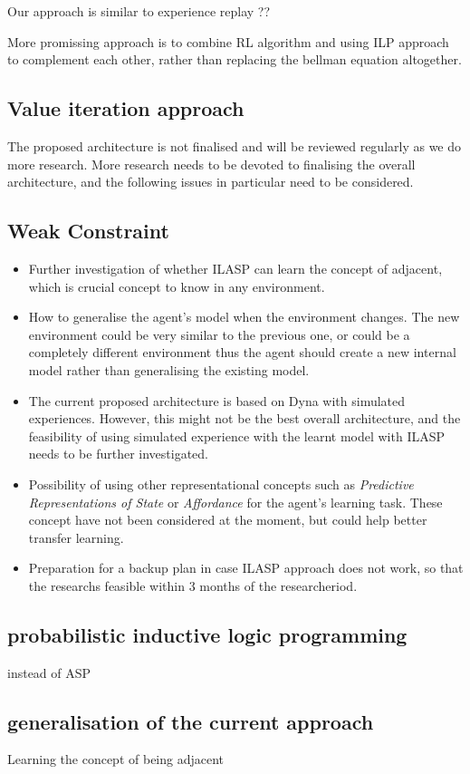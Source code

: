 Our approach is similar to experience replay ??

More promissing approach is to combine RL algorithm and using ILP approach to complement each other, rather than replacing the bellman equation altogether. 

\subsection{Value iteration approach}

The proposed architecture is not finalised and will be reviewed regularly as we do more research.
More research needs to be devoted to finalising the overall architecture, and the following issues in particular need to be considered.

\subsection{Weak Constraint}

\begin{itemize}

\item Further investigation of whether ILASP can learn the concept of adjacent, which is crucial concept to know in any environment.
\item How to generalise the agent's model when the environment changes. The new environment could be very similar to the previous one, or could be a completely different environment thus the agent should create a new internal model rather than generalising the existing model.
\item The current proposed architecture is based on Dyna with simulated experiences. However, this might not be the best overall architecture, and the feasibility of using simulated experience with the learnt model with ILASP needs to be further investigated.

\item Possibility of using other representational concepts such as \textit{Predictive Representations of State} or \textit{Affordance} \cite{Sridharan2017} for the agent's learning task. These concept have not been considered at the moment, but could help better transfer learning.

\item Preparation for a backup plan in case ILASP approach does not work, so that the researchs feasible within 3 months of the researcheriod.

\end{itemize}

\subsection{probabilistic inductive logic programming}
instead of ASP

\subsection{generalisation of the current approach}

Learning the concept of being adjacent